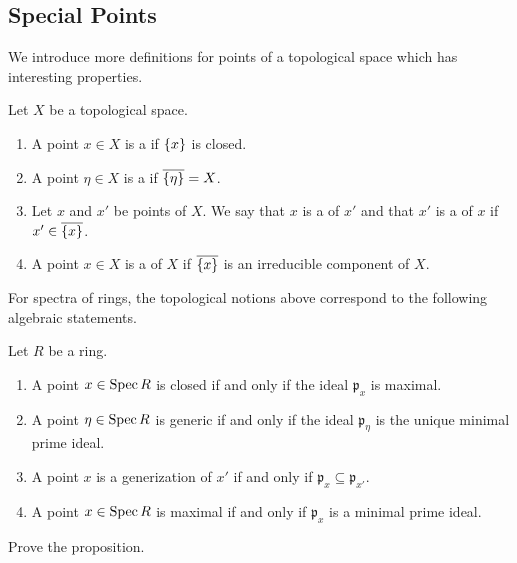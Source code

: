 \subsection*{Special Points}

We introduce more definitions for points of a topological space which has interesting properties.

\begin{definition}
	Let $X$ be a topological space.
	\begin{enumerate}
		\item A point $x \in X$ is a  if $\lbrace x\rbrace$ is closed.
		\item A point $\eta \in X$ is a  if $\overline{\lbrace\eta\rbrace }= X$.
		
		\item Let $x$ and $x'$ be points of $X$. We say that $x$ is a  of $x'$ and that $x'$ is a  of $x$ if $x' \in \overline{\lbrace x\rbrace}$.
		
		\item A point $x \in X$ is a  of $X$ if $\overline{\lbrace x\rbrace}$ is an irreducible component of $X$.
	\end{enumerate}
\end{definition}

For spectra of rings, the topological notions above correspond to the following algebraic statements.

\begin{proposition}\label{chap2:spacial-points-of-rings} Let $R$ be a ring.
	\begin{enumerate}
		\item A point $x \in \operatorname{Spec} R$ is closed if and only if the ideal $\mathfrak{p}_x$ is maximal.
		
		\item A point $\eta \in \operatorname{Spec} R$ is generic if and only if the ideal $\mathfrak{p}_{\eta}$ is the unique minimal prime ideal.
		
		\item A point $x$ is a generization of $x'$ if and only if $\mathfrak{p}_x \subseteq \mathfrak{p}_{x'}$.
		
		\item A point $x \in \operatorname{Spec} R$ is maximal if and only if $\mathfrak{p}_x$ is a minimal prime ideal.
	\end{enumerate}
\end{proposition}

\begin{exercise}
	Prove the proposition.
\end{exercise}


